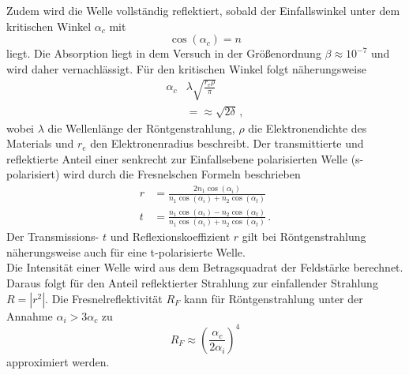 Zudem wird die Welle vollständig reflektiert, sobald der Einfallswinkel unter dem kritischen Winkel $\alpha_c$ mit
\begin{equation*}
    \cos \left ( \alpha_c \right ) = n
\end{equation*}
liegt.
Die Absorption liegt in dem Versuch in der Größenordnung $\beta \approx 10^{-7}$ und wird daher vernachlässigt.
Für den kritischen Winkel folgt näherungsweise
\begin{align}
    \alpha_c &\lambda \sqrt{\frac{r_e \rho}{\pi}} \label{eqn:kritisch_th}\\
    &= \approx \sqrt{2 \delta} \label{eqn:kritisch_exp} \, ,
\end{align}
wobei $\lambda$ die Wellenlänge der Röntgenstrahlung, $\rho$ die Elektronendichte des Materials und $r_e$ den Elektronenradius beschreibt.
Der transmittierte und reflektierte Anteil einer senkrecht zur Einfallsebene polarisierten Welle (s-polarisiert) wird durch die Fresnelschen Formeln beschrieben
\begin{align*}
    r &= \frac{2 n_1 \cos \left( \alpha_i \right)}{n_1 \cos \left( \alpha_i \right ) + n_2 \cos \left( \alpha_t \right )} \label{eqn:fresnel_r} \\
    t &= \frac{n_1 \cos \left( \alpha_i \right ) - n_2 \cos \left( \alpha_t \right )}{n_1 \cos \left( \alpha_i \right ) + n_2 \cos \left( \alpha_t \right )} \, . \label{eqn:fresnel_t}
\end{align*}
Der Transmissions- $t$ und Reflexionskoeffizient $r$ gilt bei Röntgenstrahlung näherungsweise auch für eine t-polarisierte Welle.
\\
Die Intensität einer Welle wird aus dem Betragsquadrat der Feldstärke berechnet. 
Daraus folgt für den Anteil reflektierter Strahlung zur einfallender Strahlung $R = |r^2|$.
Die Fresnelreflektivität $R_F$ kann für Röntgenstrahlung unter der Annahme $\alpha_i > 3 \alpha_c$ zu
\begin{equation}
    R_F \approx \left ( \frac{\alpha_c}{2 \alpha_i} \right )^4
    \label{eqn:fresnelreflektivitaet}
\end{equation}
approximiert werden.
\FloatBarrier

